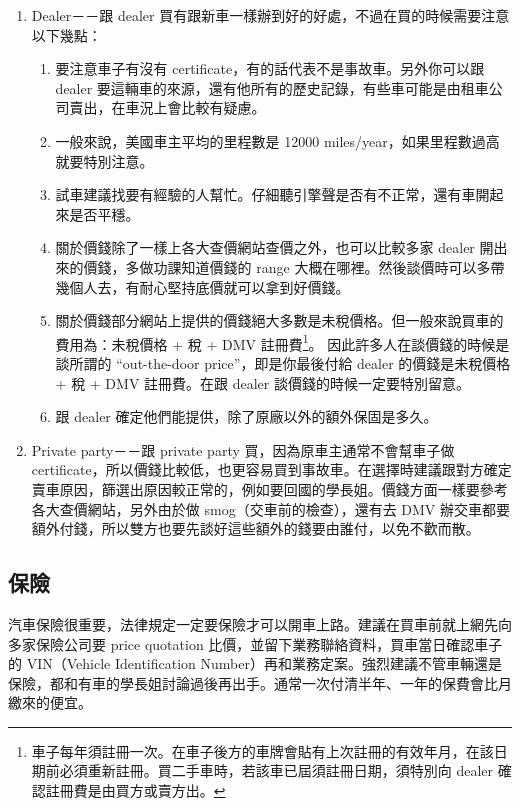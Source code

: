 \documentclass[10pt,a4paper]{book}
\begin{document}
\begin{CJK}{UTF8}{bkai}
\begin{enumerate}
\item Dealer－－跟 dealer 買有跟新車一樣辦到好的好處，不過在買的時候需要注意以下幾點：
    \begin{enumerate}
    \item 要注意車子有沒有 certificate，有的話代表不是事故車。另外你可以跟 dealer 要這輛車的來源，還有他所有的歷史記錄，有些車可能是由租車公司賣出，在車況上會比較有疑慮。
    \item 一般來說，美國車主平均的里程數是 12000 miles/year，如果里程數過高就要特別注意。
    \item 試車建議找要有經驗的人幫忙。仔細聽引擎聲是否有不正常，還有車開起來是否平穩。
    \item 關於價錢除了一樣上各大查價網站查價之外，也可以比較多家 dealer 開出來的價錢，多做功課知道價錢的 range 大概在哪裡。然後談價時可以多帶幾個人去，有耐心堅持底價就可以拿到好價錢。
    \item 關於價錢部分網站上提供的價錢絕大多數是未稅價格。但一般來說買車的費用為：未稅價格 + 稅 + DMV 註冊費\footnote{車子每年須註冊一次。在車子後方的車牌會貼有上次註冊的有效年月，在該日期前必須重新註冊。買二手車時，若該車已屆須註冊日期，須特別向 dealer 確認註冊費是由買方或賣方出。}。 因此許多人在談價錢的時候是談所謂的 ``out-the-door price''，即是你最後付給 dealer 的價錢是未稅價格 + 稅 + DMV 註冊費。在跟 dealer 談價錢的時候一定要特別留意。
    \item 跟 dealer 確定他們能提供，除了原廠以外的額外保固是多久。
    \end{enumerate}
\item Private party－－跟 private party 買，因為原車主通常不會幫車子做 certificate，所以價錢比較低，也更容易買到事故車。在選擇時建議跟對方確定賣車原因，篩選出原因較正常的，例如要回國的學長姐。價錢方面一樣要參考各大查價網站，另外由於做 smog（交車前的檢查），還有去 DMV 辦交車都要額外付錢，所以雙方也要先談好這些額外的錢要由誰付，以免不歡而散。
\end{enumerate}

\subsection{保險}
汽車保險很重要，法律規定一定要保險才可以開車上路。建議在買車前就上網先向多家保險公司要 price quotation 比價，並留下業務聯絡資料，買車當日確認車子的 VIN（Vehicle Identification Number）再和業務定案。強烈建議不管車輛還是保險，都和有車的學長姐討論過後再出手。通常一次付清半年、一年的保費會比月繳來的便宜。


\end{CJK}
\end{document}
